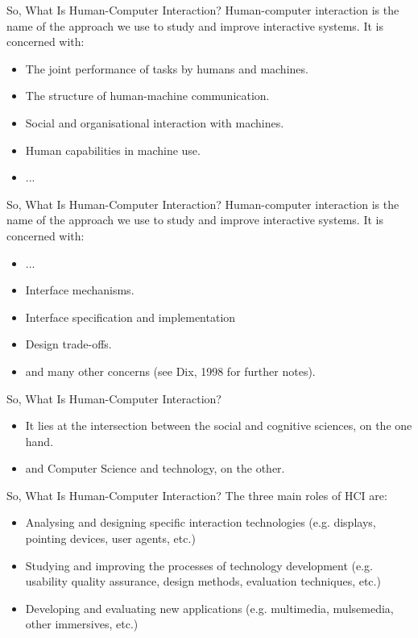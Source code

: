 \begin{frame}{So, What Is Human-Computer Interaction?}
	Human-computer interaction is the name of the approach we use to study and improve interactive systems. It is concerned with:
	
	\begin{itemize}
		\item The joint performance of tasks by humans and machines. 
		\item The structure of human-machine communication.
		\item Social and organisational interaction with machines.
		\item Human capabilities in machine use.
		\item ...
	\end{itemize}
\end{frame}

\begin{frame}{So, What Is Human-Computer Interaction?}
	Human-computer interaction is the name of the approach we use to study and improve interactive systems. It is concerned with:
	
	\begin{itemize}
		\item ...
		\item Interface mechanisms.
		\item Interface specification and implementation
		\item Design trade-offs.
		\item and many other concerns (see Dix, 1998 for further notes).
	\end{itemize}
\end{frame}

\begin{frame}{So, What Is Human-Computer Interaction?}
	\begin{itemize}
		\item It lies at the intersection between the social and cognitive sciences, on the one hand.
		\item and Computer Science and technology, on the other.
	\end{itemize}
\end{frame}

\begin{frame}{So, What Is Human-Computer Interaction?}
	The three main roles of HCI are:
	
	\begin{itemize}
		\item Analysing and designing specific interaction technologies (e.g. displays, pointing devices, user agents, etc.)
		\item Studying and improving the processes of technology development (e.g. usability quality assurance, design methods, evaluation techniques, etc.)
		\item Developing and evaluating new applications (e.g. multimedia, mulsemedia, other immersives, etc.)
	\end{itemize}
\end{frame}

